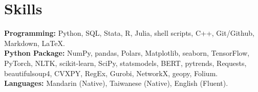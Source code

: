 \documentclass{academicThemeCV}
\begin{document}
\section{Skills}
  \vspace{1pt}
  \resumeSubHeadingListStart
    \vspace{-5pt}
    \small{\item{
        \textbf{Programming: }{Python, SQL, Stata, R, Julia, shell scripts,
        C++, Git/Github, Markdown, \LaTeX.} \\[3pt]
        \textbf{Python Package: }{
        NumPy, pandas, Polars, Matplotlib, seaborn, 
        TensorFlow, PyTorch, NLTK, scikit-learn, SciPy, statsmodels,
        BERT, pytrends, Requests, beautifulsoup4, CVXPY, RegEx, 
        Gurobi, NetworkX, geopy, Folium.} \\[3pt]
      \textbf{Languages: }{Mandarin (Native), Taiwanese (Native), English (Fluent).}
        
    }}
  \resumeSubHeadingListEnd



\end{document}
